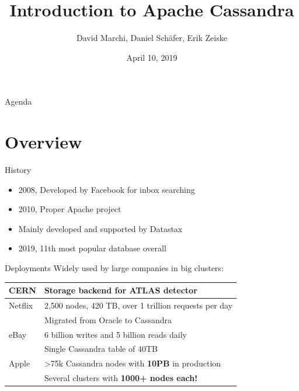 \documentclass[
  10pt
]{beamer}
\title{Introduction to Apache Cassandra}
\subtitle{}
\date{April 10, 2019}
\author{David Marchi, Daniel Schäfer, Erik Zeiske}
\begin{document}
\maketitle

\begin{frame}{Agenda}
  \tableofcontents[pausesections]
\end{frame}

\section{Overview}  %

\begin{frame}{History \cite{cassandra_paper, cassandra_apache, db_engines}}
  \begin{itemize}
    \item 2008, Developed by Facebook for inbox searching
    \item 2010, Proper Apache project
    \item Mainly developed and supported by Datastax
    \item 2019, 11th most popular database overall
  \end{itemize}
\end{frame}

\begin{frame}{Deployments \cite{cern, netflix, ebay, ebay2, apple}}
  Widely used by large companies in big clusters:

  \begin{tabular}{@{}ll}
    \hline
    CERN    & Storage backend for ATLAS detector \\
    \hline
    Netflix & 2,500 nodes, 420 TB, over 1 trillion requests per day \\
            & Migrated from Oracle to Cassandra \\
    \hline
    eBay    & 6 billion writes and 5 billion reads daily \\
            & Single Cassandra table of 40TB \\
    \hline
    Apple   & >75k Cassandra nodes with \textbf{10PB} in production \\
            & Several clusters with \textbf{1000+ nodes each!} \\
    \hline
  \end{tabular}

\end{frame}
\end{document}
